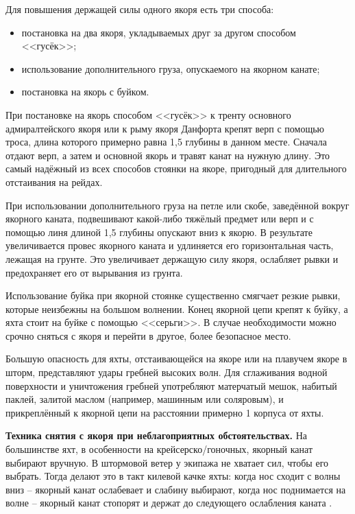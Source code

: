 Для повышения держащей силы одного якоря есть три способа: 
\begin{itemize}
\item постановка на два якоря, укладываемых друг за другом способом <<гусёк>>; 
\item использование дополнительного груза, опускаемого на якорном канате; 
\item постановка на якорь с буйком. 
\end{itemize}

При постановке на якорь способом
<<гусёк>> к тренту основного
адмиралтейского якоря или к рыму якоря Данфорта крепят верп с помощью
троса, длина которого примерно равна 1,5 глубины в данном
месте. Сначала отдают верп, а затем и основной якорь и травят канат на
нужную длину. Это самый надёжный из всех способов стоянки на якоре,
пригодный для длительного отстаивания на рейдах.

При использовании дополнительного груза на петле или скобе, заведённой
вокруг якорного каната, подвешивают какой-либо тяжёлый предмет или
верп и с помощью линя длиной 1,5 глубины опускают вниз к
якорю. В результате увеличивается провес якорного каната и удлиняется
его горизонтальная часть, лежащая на грунте. Это увеличивает держащую
силу якоря, ослабляет рывки и предохраняет его от вырывания из грунта.

Использование буйка при якорной стоянке существенно смягчает резкие
рывки, которые неизбежны на большом волнении. Конец якорной цепи
крепят к буйку, а яхта стоит на буйке с помощью <<серьги>>. В случае
необходимости можно срочно сняться с якоря и перейти в другое, более
безопасное место.

Большую опасность для яхты, отстаивающейся на якоре или на плавучем
якоре в шторм, представляют удары гребней высоких волн. Для
сглаживания водной поверхности и уничтожения гребней употребляют
матерчатый мешок, набитый паклей, залитой маслом (например, машинным
или соляровым), и прикреплённый к якорной цепи на расстоянии примерно
1 корпуса от яхты.

\textbf{Техника снятия с якоря при неблагоприятных обстоятельствах.}
На большинстве яхт, в особенности на крейсерско\-/гоночных, якорный
канат выбирают вручную. В штормовой ветер у экипажа не хватает сил,
чтобы его выбрать. Тогда делают это в такт килевой качке яхты: когда
нос сходит с волны вниз \--- якорный канат ослабевает и слабину
выбирают, когда нос поднимается на волне \--- якорный канат стопорят и
держат до следующего ослабления каната .

